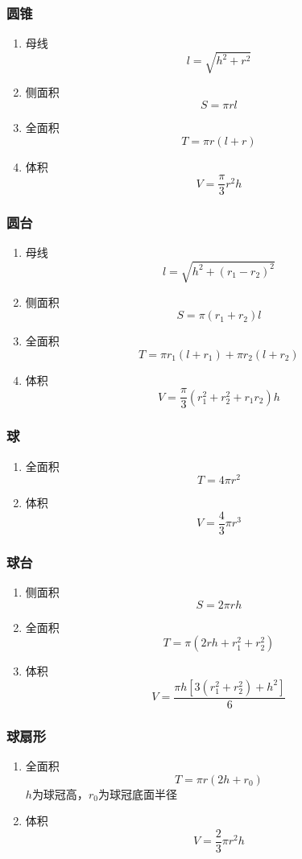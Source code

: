 \subsubsection{圆锥}
	\begin{enumerate}
		\item 母线
			$$l=\sqrt{h^2+r^2}$$
		\item 侧面积
			$$S=\pi rl$$
		\item 全面积
			$$T=\pi r(l+r)$$
		\item 体积
			$$V=\frac{\pi}{3} r^2h$$
	\end{enumerate}
\subsubsection{圆台}
	\begin{enumerate}
		\item 母线
			$$l=\sqrt{h^2+(r_1-r_2)^2}$$
		\item 侧面积
			$$S=\pi(r_1+r_2)l$$
		\item 全面积
			$$T=\pi r_1(l+r_1)+\pi r_2(l+r_2)$$
		\item 体积
			$$V=\frac{\pi}{3}(r_1^2+r_2^2+r_1r_2)h$$
	\end{enumerate}
\subsubsection{球}
	\begin{enumerate}
		\item 全面积
			$$T=4\pi r^2$$
		\item 体积
			$$V=\frac{4}{3}\pi r^3$$
	\end{enumerate}
\subsubsection{球台}
	\begin{enumerate}
		\item 侧面积
			$$S=2\pi rh$$
		\item 全面积
			$$T=\pi(2rh+r_1^2+r_2^2)$$
		\item 体积
			$$V=\frac{\pi h[3(r_1^2+r_2^2)+h^2]}{6}$$
	\end{enumerate}
\subsubsection{球扇形}
	\begin{enumerate}
		\item 全面积
			$$T=\pi r(2h+r_0)$$
			$h$为球冠高，$r_0$为球冠底面半径
		\item 体积
			$$V=\frac{2}{3}\pi r^2h$$
	\end{enumerate}
